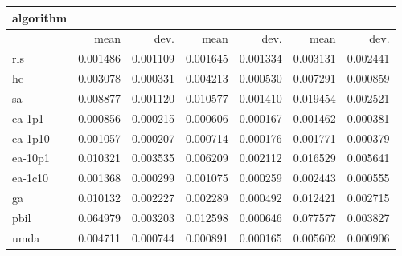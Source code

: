 \begin{tabular}{@{}l*{6}{>{{}}N{1}{2}}@{}}
\toprule
{algorithm} &  &  &  \\
\midrule
& {mean} & {dev.} & {mean} & {dev.} & {mean} & {dev.} \\
\midrule
rls & 0.001486 & 0.001109 & 0.001645 & 0.001334 & 0.003131 & 0.002441 \\
 hc & 0.003078 & 0.000331 & 0.004213 & 0.000530 & 0.007291 & 0.000859 \\
 sa & 0.008877 & 0.001120 & 0.010577 & 0.001410 & 0.019454 & 0.002521 \\
 ea-1p1 & 0.000856 & 0.000215 & 0.000606 & 0.000167 & 0.001462 & 0.000381 \\
 ea-1p10 & 0.001057 & 0.000207 & 0.000714 & 0.000176 & 0.001771 & 0.000379 \\
 ea-10p1 & 0.010321 & 0.003535 & 0.006209 & 0.002112 & 0.016529 & 0.005641 \\
 ea-1c10 & 0.001368 & 0.000299 & 0.001075 & 0.000259 & 0.002443 & 0.000555 \\
 ga & 0.010132 & 0.002227 & 0.002289 & 0.000492 & 0.012421 & 0.002715 \\
 pbil & 0.064979 & 0.003203 & 0.012598 & 0.000646 & 0.077577 & 0.003827 \\
 umda & 0.004711 & 0.000744 & 0.000891 & 0.000165 & 0.005602 & 0.000906 \\
 \bottomrule
\end{tabular}
